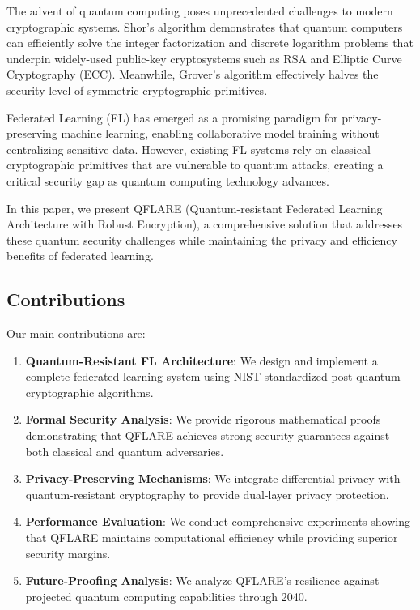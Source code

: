 \documentclass[journal,onecolumn,draftclsnofoot]{IEEEtran}
\begin{document}
The advent of quantum computing poses unprecedented challenges to modern cryptographic systems. Shor's algorithm \cite{shor1994algorithms} demonstrates that quantum computers can efficiently solve the integer factorization and discrete logarithm problems that underpin widely-used public-key cryptosystems such as RSA and Elliptic Curve Cryptography (ECC). Meanwhile, Grover's algorithm \cite{grover1996fast} effectively halves the security level of symmetric cryptographic primitives.

Federated Learning (FL) \cite{mcmahan2017communication} has emerged as a promising paradigm for privacy-preserving machine learning, enabling collaborative model training without centralizing sensitive data. However, existing FL systems rely on classical cryptographic primitives that are vulnerable to quantum attacks, creating a critical security gap as quantum computing technology advances.

In this paper, we present QFLARE (Quantum-resistant Federated Learning Architecture with Robust Encryption), a comprehensive solution that addresses these quantum security challenges while maintaining the privacy and efficiency benefits of federated learning.

\subsection{Contributions}

Our main contributions are:

\begin{enumerate}
\item \textbf{Quantum-Resistant FL Architecture}: We design and implement a complete federated learning system using NIST-standardized post-quantum cryptographic algorithms.

\item \textbf{Formal Security Analysis}: We provide rigorous mathematical proofs demonstrating that QFLARE achieves strong security guarantees against both classical and quantum adversaries.

\item \textbf{Privacy-Preserving Mechanisms}: We integrate differential privacy with quantum-resistant cryptography to provide dual-layer privacy protection.

\item \textbf{Performance Evaluation}: We conduct comprehensive experiments showing that QFLARE maintains computational efficiency while providing superior security margins.

\item \textbf{Future-Proofing Analysis}: We analyze QFLARE's resilience against projected quantum computing capabilities through 2040.
\end{enumerate}
\end{document}
